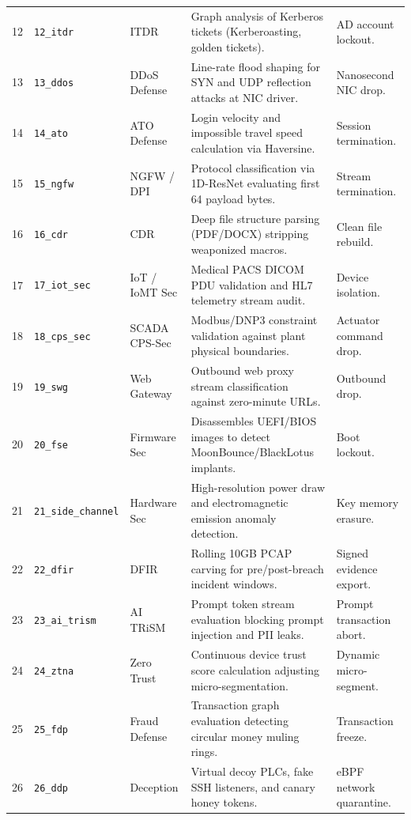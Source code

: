 \documentclass[11pt,a4paper]{article}
\begin{document}
\begin{footnotesize}
\begin{longtable}{@{}p{} p{} p{} p{} p{}@{}}
12 & \texttt{12\_itdr} & ITDR & Graph analysis of Kerberos tickets (Kerberoasting, golden tickets). & AD account lockout. \\
13 & \texttt{13\_ddos} & DDoS Defense & Line-rate flood shaping for SYN and UDP reflection attacks at NIC driver. & Nanosecond NIC drop. \\
14 & \texttt{14\_ato} & ATO Defense & Login velocity and impossible travel speed calculation via Haversine. & Session termination. \\
15 & \texttt{15\_ngfw} & NGFW / DPI & Protocol classification via 1D-ResNet evaluating first 64 payload bytes. & Stream termination. \\
16 & \texttt{16\_cdr} & CDR & Deep file structure parsing (PDF/DOCX) stripping weaponized macros. & Clean file rebuild. \\
17 & \texttt{17\_iot\_sec} & IoT / IoMT Sec & Medical PACS DICOM PDU validation and HL7 telemetry stream audit. & Device isolation. \\
18 & \texttt{18\_cps\_sec} & SCADA CPS-Sec & Modbus/DNP3 constraint validation against plant physical boundaries. & Actuator command drop. \\
19 & \texttt{19\_swg} & Web Gateway & Outbound web proxy stream classification against zero-minute URLs. & Outbound drop. \\
20 & \texttt{20\_fse} & Firmware Sec & Disassembles UEFI/BIOS images to detect MoonBounce/BlackLotus implants. & Boot lockout. \\
21 & \texttt{21\_side\_channel}& Hardware Sec & High-resolution power draw and electromagnetic emission anomaly detection. & Key memory erasure. \\
22 & \texttt{22\_dfir} & DFIR & Rolling 10GB PCAP carving for pre/post-breach incident windows. & Signed evidence export. \\
23 & \texttt{23\_ai\_trism} & AI TRiSM & Prompt token stream evaluation blocking prompt injection and PII leaks. & Prompt transaction abort. \\
24 & \texttt{24\_ztna} & Zero Trust & Continuous device trust score calculation adjusting micro-segmentation. & Dynamic micro-segment. \\
25 & \texttt{25\_fdp} & Fraud Defense & Transaction graph evaluation detecting circular money muling rings. & Transaction freeze. \\
26 & \texttt{26\_ddp} & Deception & Virtual decoy PLCs, fake SSH listeners, and canary honey tokens. & eBPF network quarantine. \\ \bottomrule
\end{longtable}
\end{footnotesize}
\end{document}
